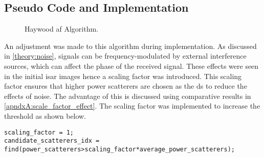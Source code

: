 \documentclass[class=report,11pt,crop=false]{standalone}
\begin{document}
    \subsection{Pseudo Code and Implementation}
    \begin{figure}[ht]
      \vspace{0.5cm}
      \centering
      \captionsetup{type=figure}
      \begin{minipage}{.7\linewidth}
        \begin{algorithm}[H]
            \caption{Haywood \gls{af} Algorithm.\label{alg:haywood_AF}}
    
            \DontPrintSemicolon
            \SetAlgoLined
    
    
            \BlankLine
          \vspace{0.5cm}
        \end{algorithm}
      \end{minipage}
    \end{figure}

    An adjustment was made to this algorithm during implementation. As discussed in \autoref{theory:noise}, signals can be frequency-modulated by external interference sources, which can affect the phase of the received signal. These effects were seen in the initial \gls{isar} images hence a scaling factor was introduced. This scaling factor ensures that higher power scatterers are chosen as the \gls{ds} to reduce the effects of noise. The advantage of this is discussed using comparative results in \autoref{apndxA:scale_factor_effect}. The scaling factor was implemented to increase the threshold as shown below.
    
\begin{lstlisting}[caption={\textsc{Matlab} code for selecting candidate dominant scatterers.},label={code:scale_factor}]
scaling_factor = 1;
candidate_scatterers_idx = find(power_scatterers>scaling_factor*average_power_scatterers);
\end{lstlisting}
\end{document}
